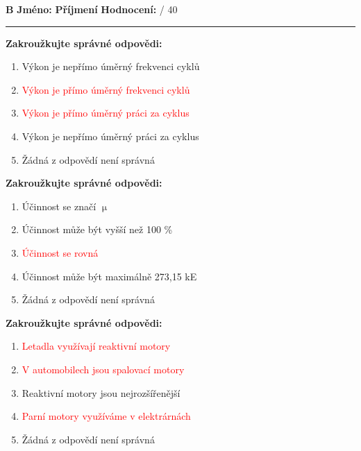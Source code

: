 \documentclass[../main.tex]{subfiles}
\begin{document}
\edef\hmm{\pdfpagewidth=\the\pdfpagewidth \pdfpageheight=\the\pdfpageheight\relax}
\pdfpagewidth=210mm
\pdfpageheight=297mm

\textbf{B}
\hspace{1cm}
\textbf{Jméno:}
\tecky{4cm}
\hspace{0.25cm}
\textbf{Příjmení}
\tecky{4cm}
\hfill
\textbf{Hodnocení:}
\tecky{0.5cm}
{/}
{40}
\vspace{0.25cm}
\hrule
\vspace{0.25cm}

\begin{enumerate}[label={\textbf{\arabic*.}}]
\begin{minipage}{0.45\textwidth}
    \item \textbf{Zakroužkujte správné odpovědi:}
        \begin{enumerate}[label={\alph*)}, itemsep=0pt, topsep=0.15cm]
            \item {Výkon je nepřímo úměrný frekvenci cyklů}
            \item \textcolor{red}{{Výkon je přímo úměrný frekvenci cyklů}}
            \item \textcolor{red}{{Výkon je přímo úměrný práci za cyklus}}
            \item {Výkon je nepřímo úměrný práci za cyklus}
            \item {Žádná z odpovědí není správná}
        \end{enumerate}

    \item \textbf{Zakroužkujte správné odpovědi:}
        \begin{enumerate}[label={\alph*)}, itemsep=0pt, topsep=0.15cm]
            \item {Účinnost se značí \(\upmu\)}
            \item {Účinnost může být vyšší než 100 \%}
            \item \textcolor{red}{{Účinnost se rovná }}
            \item {Účinnost může být maximálně 273,15 kE}
            \item {Žádná z odpovědí není správná}
        \end{enumerate}

    \item \textbf{Zakroužkujte správné odpovědi:}
        \begin{enumerate}[label={\alph*)}, itemsep=0pt, topsep=0.15cm]
            \item \textcolor{red}{{Letadla využívají reaktivní motory}}
            \item \textcolor{red}{{V automobilech jsou spalovací motory}}
            \item {Reaktivní motory jsou nejrozšířenější}
            \item \textcolor{red}{{Parní motory využíváme v elektrárnách}}
            \item {Žádná z odpovědí není správná}
        \end{enumerate}


\end{minipage}
\end{enumerate}
\end{document}
